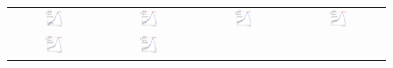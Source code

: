 \begin{figure}[ht]
  \begin{center}
    \begin{tabular}{cccc}
      \includegraphics[width=0.22\textwidth]{figures/Zprime/2017/mass_resolution/High_Mass/BE_120_200} &
      \includegraphics[width=0.22\textwidth]{figures/Zprime/2017/mass_resolution/High_Mass/BE_200_400}&
      \includegraphics[width=0.22\textwidth]{figures/Zprime/2017/mass_resolution/High_Mass/BE_400_800} &
      \includegraphics[width=0.22\textwidth]{figures/Zprime/2017/mass_resolution/High_Mass/BE_800_1400} \\
      \includegraphics[width=0.22\textwidth]{figures/Zprime/2017/mass_resolution/High_Mass/BE_1400_2300} &
      \includegraphics[width=0.22\textwidth]{figures/Zprime/2017/mass_resolution/High_Mass/BE_2300_3500}&

\end{tabular}
\end{center}
\end{figure}

